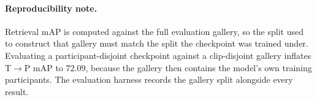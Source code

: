 \paragraph{Reproducibility note.}
Retrieval mAP is computed against the full evaluation gallery, so the split
used to construct that gallery must match the split the checkpoint was
trained under. Evaluating a participant-disjoint checkpoint against a
clip-disjoint gallery inflates T$\rightarrow$P mAP to $72.09$,
because the gallery then contains the model's own training participants.
The evaluation harness records the gallery split alongside every result.
